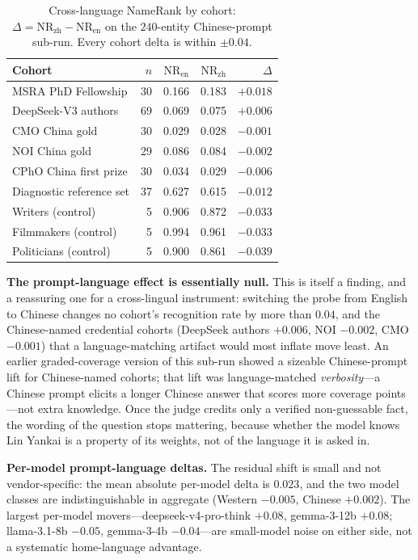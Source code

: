\begin{table}[!htbp]
\centering
\small
\caption{Cross-language NameRank by cohort: $\Delta = \mathrm{NR}_\mathrm{zh} - \mathrm{NR}_\mathrm{en}$ on the $240$-entity Chinese-prompt sub-run. Every cohort delta is within $\pm 0.04$.}
\label{tab:cross-lang}
\begin{tabular}{lrrrr}
\toprule
Cohort & $n$ & $\mathrm{NR}_\mathrm{en}$ & $\mathrm{NR}_\mathrm{zh}$ & $\Delta$ \\
\midrule
MSRA PhD Fellowship & 30 & 0.166 & 0.183 & $+0.018$ \\
DeepSeek-V3 authors & 69 & 0.069 & 0.075 & $+0.006$ \\
CMO China gold & 30 & 0.029 & 0.028 & $-0.001$ \\
NOI China gold & 29 & 0.086 & 0.084 & $-0.002$ \\
CPhO China first prize & 30 & 0.034 & 0.029 & $-0.006$ \\
Diagnostic reference set & 37 & 0.627 & 0.615 & $-0.012$ \\
Writers (control) & 5 & 0.906 & 0.872 & $-0.033$ \\
Filmmakers (control) & 5 & 0.994 & 0.961 & $-0.033$ \\
Politicians (control) & 5 & 0.900 & 0.861 & $-0.039$ \\
\bottomrule
\end{tabular}
\end{table}

\textbf{The prompt-language effect is essentially null.} This is itself a finding, and a reassuring one for a cross-lingual instrument: switching the probe from English to Chinese changes no cohort's recognition rate by more than $0.04$, and the Chinese-named credential cohorts (DeepSeek authors $+0.006$, NOI $-0.002$, CMO $-0.001$) that a language-matching artifact would most inflate move least. An earlier graded-coverage version of this sub-run showed a sizeable Chinese-prompt lift for Chinese-named cohorts; that lift was language-matched \emph{verbosity}---a Chinese prompt elicits a longer Chinese answer that scores more coverage points---not extra knowledge. Once the judge credits only a verified non-guessable fact, the wording of the question stops mattering, because whether the model knows Lin Yankai is a property of its weights, not of the language it is asked in.

\textbf{Per-model prompt-language deltas.} The residual shift is small and not vendor-specific: the mean absolute per-model delta is $0.023$, and the two model classes are indistinguishable in aggregate (Western $-0.005$, Chinese $+0.002$). The largest per-model movers---deepseek-v4-pro-think $+0.08$, gemma-3-12b $+0.08$; llama-3.1-8b $-0.05$, gemma-3-4b $-0.04$---are small-model noise on either side, not a systematic home-language advantage.

